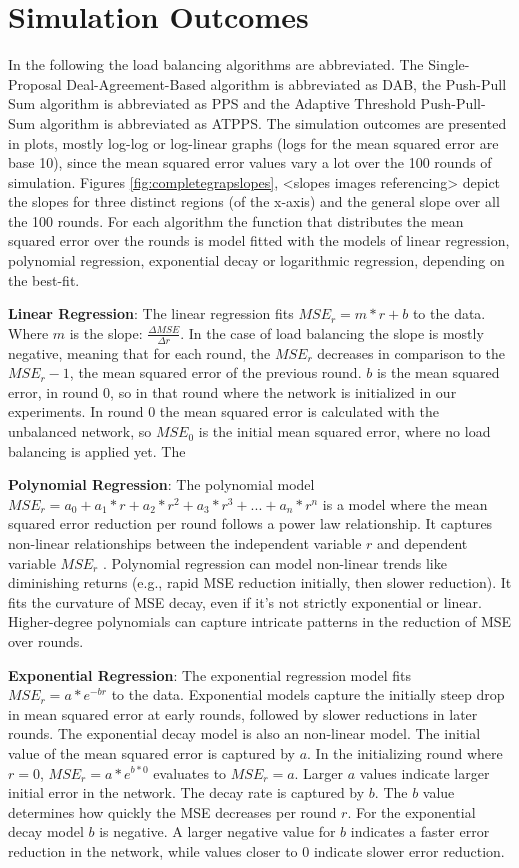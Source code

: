 \chapter{Simulation Outcomes}\label{chap:simulationoutcomes}
In the following the load balancing algorithms are abbreviated. The Single-Proposal Deal-Agreement-Based algorithm is abbreviated as DAB, the Push-Pull Sum algorithm is abbreviated as PPS and the Adaptive Threshold Push-Pull-Sum algorithm is abbreviated as ATPPS. The simulation outcomes are presented in plots, mostly log-log or log-linear graphs (logs for the mean squared error are base 10), since the mean squared error values vary a lot over the 100 rounds of simulation. Figures \ref{fig:completegrapslopes}, <slopes images referencing>  depict the slopes for three distinct regions (of the x-axis) and the general slope over all the 100 rounds. For each algorithm the function that distributes the mean squared error over the rounds is model fitted with the models of linear regression, polynomial regression, exponential decay or logarithmic regression, depending on the best-fit.

\textbf{Linear Regression}: The linear regression fits $MSE_r=m*r+b$ to the data. Where $m$ is the slope: $\frac{\Delta MSE}{\Delta r}$. In the case of load balancing the slope is mostly negative, meaning that for each round, the $MSE_r$ decreases in comparison to the $MSE_r-1$, the mean squared error of the previous round. $b$ is the mean squared error, in round 0, so in that round where the network is initialized in our experiments. In round 0 the mean squared error is calculated with the unbalanced network, so $MSE_0$ is the initial mean squared error, where no load balancing is applied yet. The 

\textbf{Polynomial Regression}: The polynomial model $MSE_r=a_0+a_1*r+a_2*r^{2}+a_3*r^{3}+...+a_n*r^{n}$ is a model where the mean squared error reduction per round follows a power law relationship. It captures non-linear relationships between the independent variable $r$ and dependent variable $MSE_r$ \cite{MotulskyDataFitting}. Polynomial regression can model non-linear trends like diminishing returns (e.g., rapid MSE reduction initially, then slower reduction). It fits the curvature of MSE decay, even if it's not strictly exponential or linear. Higher-degree polynomials can capture intricate patterns in the reduction of MSE over rounds.

\textbf{Exponential Regression}: The exponential regression model fits $MSE_r=a*e^{-br}$ to the data. Exponential models capture the initially steep drop in mean squared error at early rounds, followed by slower reductions in later rounds. The exponential decay model is also an non-linear model. The initial value of the mean squared error is captured by $a$. In the initializing round where $r=0$, $MSE_r=a*e^{b*0}$ evaluates to $MSE_r=a$. Larger $a$ values indicate larger initial error in the network. The decay rate is captured by $b$. The $b$ value determines how quickly the MSE decreases per round $r$. For the exponential decay model $b$ is negative. A larger negative value for $b$ indicates a faster error reduction in the network, while values closer to 0 indicate slower error reduction.

